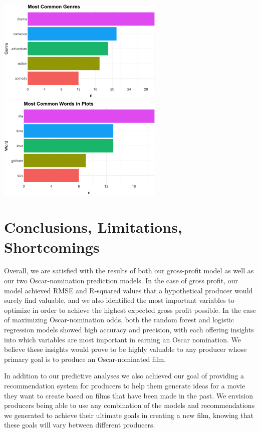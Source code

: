 \documentclass[10pt]{article}
\begin{document}
\begin{center}
\includegraphics[width=8cm]{_assets/_assets_knn/forrest_gump_common_genres.png}
\hspace{1cm}
\includegraphics[width=8cm]{_assets/_assets_knn/forrest_gump_common_words.png}

\end{center}

\section{Conclusions, Limitations, Shortcomings}
Overall, we are satisfied with the results of both our gross-profit model as well as our two Oscar-nomination prediction models. In the case of gross profit, our model achieved RMSE and R-squared values that a hypothetical producer would surely find valuable, and we also identified the most important variables to optimize in order to achieve the highest expected gross profit possible. In the case of maximizing Oscar-nomination odds, both the random forest and logistic regression models showed high accuracy and precision, with each offering insights into which variables are most important in earning an Oscar nomination. We believe these insights would prove to be highly valuable to any producer whose primary goal is to produce an Oscar-nominated film.

In addition to our predictive analyses we also achieved our goal of providing a recommendation system for producers to help them generate ideas for a movie they want to create based on films that have been made in the past. We envision producers being able to use any combination of the models and recommendations we generated to achieve their ultimate goals in creating a new film, knowing that these goals will vary between different producers.
\end{document}
